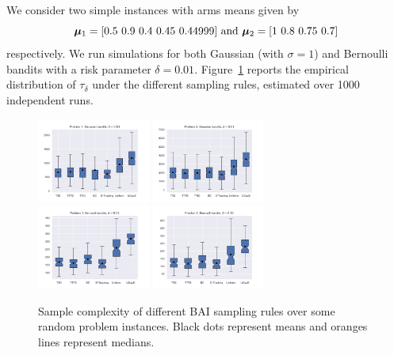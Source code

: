 We consider two simple instances with arms means given by 
\[
    {\boldsymbol \mu}_1 = [0.5 \ 0.9 \ 0.4 \ 0.45 \ 0.44999] \text{ and } {\boldsymbol \mu}_2 = [1 \ 0.8 \ 0.75 \ 0.7]
\]
respectively. We run simulations for both Gaussian (with $\sigma=1$) and Bernoulli bandits with a risk parameter $\delta=0.01$. %
Figure~\ref{fig:confidence} reports the empirical distribution of $\tau_\delta$ under the different sampling rules, estimated over 1000 independent runs. 

\begin{figure}[ht]
\centering
\includegraphics[clip, width= 0.33\textwidth]{Chapter3/img/gaussian1.pdf}
\includegraphics[clip, width= 0.33\textwidth]{Chapter3/img/gaussian2.pdf}
\includegraphics[clip, width= 0.33\textwidth]{Chapter3/img/bernoulli1.pdf}
\includegraphics[clip, width= 0.33\textwidth]{Chapter3/img/bernoulli2.pdf}
\caption{Sample complexity of different BAI sampling rules over some random problem instances. Black dots represent means and oranges lines represent medians.}
\label{fig:confidence}
\end{figure}

